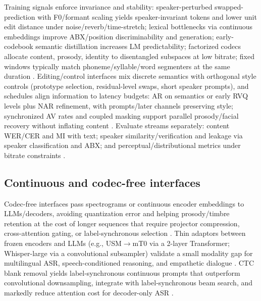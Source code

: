 \documentclass{article}
\begin{document}
Training signals enforce invariance and stability: speaker-perturbed swapped-prediction with F0/formant scaling yields speaker-invariant tokens and lower unit edit distance under noise/reverb/time-stretch; lexical bottlenecks via continuous embeddings improve ABX/position discriminability and generation; early-codebook semantic distillation increases LM predictability; factorized codecs allocate content, prosody, identity to disentangled subspaces at low bitrate; fixed windows typically match phoneme/syllable/word segmenters at the same duration \cite{chang2024dcspinspeakerinvariantspeechtokenizerspo,algayres2023generativespokenlanguagemodelbasedcontin,guo2025recentadvancesdiscretespeechtokensreview,kando2025exploringeffectsegmentationvocabularysiz}. Editing/control interfaces mix discrete semantics with orthogonal style controls (prototype selection, residual-level swaps, short speaker prompts), and schedules align information to latency budgets: AR on semantics or early RVQ levels plus NAR refinement, with prompts/later channels preserving style; synchronized AV rates and coupled masking support parallel prosody/facial recovery without inflating content \cite{chen2025emovaempoweringlanguagemodelsseehearspea,zhang2024speechtokenizerunifiedspeechtokenizerlar,peng2024mslms2stmultitaskspeechlanguagemodeltext,wang2025bossbeyondsemanticspeech,yang2025diffsoundstreamefficientspeechtokenizati,sadok2025vectorquantizedmaskedautoencoderaudiovis}. Evaluate streams separately: content WER/CER and MI with text; speaker similarity/verification and leakage via speaker classification and ABX; and perceptual/distributional metrics under bitrate constraints \cite{zhang2024speechtokenizerunifiedspeechtokenizerlar,guo2025recentadvancesdiscretespeechtokensreview}.

\subsection{Continuous and codec-free interfaces} \label{subsec:Continuous and codec-free interfaces}
Codec-free interfaces pass spectrograms or continuous encoder embeddings to LLMs/decoders, avoiding quantization error and helping prosody/timbre retention at the cost of longer sequences that require projector compression, cross-attention gating, or label-synchronous selection \cite{guo2025recentadvancesdiscretespeechtokensreview}. Thin adaptors between frozen encoders and LLMs (e.g., USM$\rightarrow$mT0 via a 2-layer Transformer; Whisper-large via a convolutional subsampler) validate a small modality gap for multilingual ASR, speech-conditioned reasoning, and empathetic dialogue \cite{wang2023slmbridgethingapbetweenspeechtextfoundat,wang2024blspemotowardsempatheticlargespeechlangu,nguyen2025qwenvsgemmaintegrationwhispercomparative}. CTC blank removal yields label-synchronous continuous prompts that outperform convolutional downsampling, integrate with label-synchronous beam search, and markedly reduce attention cost for decoder-only ASR \cite{tsunoo2024decoderonlyarchitecturespeechrecognition}.
\end{document}
